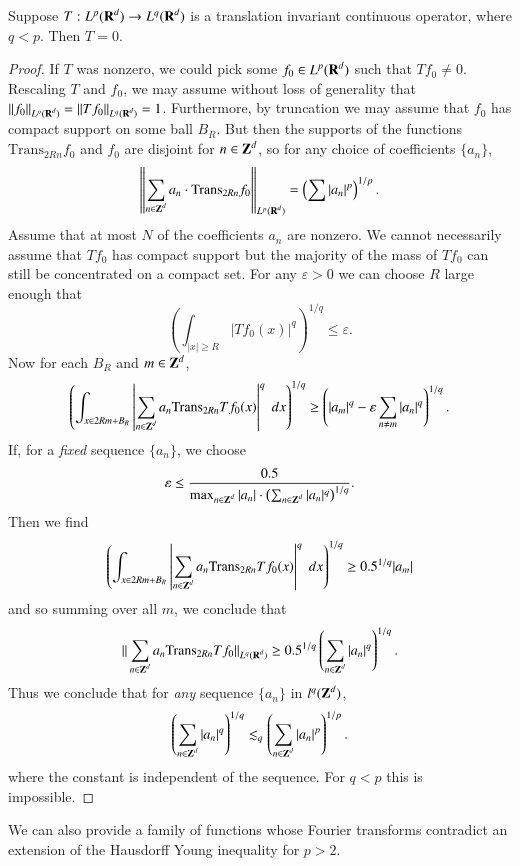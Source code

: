 \begin{theorem}
    Suppose $T: L^p(\operatorname{\mathbf{R}}^d) \to L^q(\operatorname{\mathbf{R}}^d)$ is a translation invariant continuous operator, where $q < p$. Then $T = 0$.
\end{theorem}
\begin{proof}
    If $T$ was nonzero, we could pick some $f_0 \in L^p(\operatorname{\mathbf{R}}^d)$ such that $Tf_0 \neq 0$. Rescaling $T$ and $f_0$, we may assume without loss of generality that $\| f_0 \|_{L^p(\operatorname{\mathbf{R}}^d)} = \| Tf_0 \|_{L^q(\operatorname{\mathbf{R}}^d)} = 1$. Furthermore, by truncation we may assume that $f_0$ has compact support on some ball $B_R$. But then the supports of the functions $\text{Trans}_{2Rn} f_0$ and $f_0$ are disjoint for $n \in \operatorname{\mathbf{Z}}^d$, so for any choice of coefficients $\{ a_n \}$,
    \[ \left\| \sum_{n \in \operatorname{\mathbf{Z}}^d} a_n \cdot \text{Trans}_{2R n} f_0 \right\|_{L^p(\operatorname{\mathbf{R}}^d)} = \left( \sum |a_n|^p \right)^{1/p}. \]
    Assume that at most $N$ of the coefficients $a_n$ are nonzero. We cannot necessarily assume that $Tf_0$ has compact support but the majority of the mass of $Tf_0$ can still be concentrated on a compact set. For any $\varepsilon > 0$ we can choose $R$ large enough that
    \[ \left( \int_{|x| \geq R} |Tf_0(x)|^q \right)^{1/q} \leq \varepsilon. \]
    Now for each $B_R$ and $m \in \operatorname{\mathbf{Z}}^d$,
    \[ \left( \int_{x \in 2Rm + B_R} \left| \sum_{n \in \operatorname{\mathbf{Z}}^d} a_n \text{Trans}_{2Rn} Tf_0(x) \right|^q\; dx \right)^{1/q} \geq \left( |a_m|^q - \varepsilon \sum_{n \neq m} |a_n|^q \right)^{1/q}. \]
    If, for a \emph{fixed} sequence $\{ a_n \}$, we choose
    \[ \varepsilon \leq \frac{0.5}{\max_{n \in \operatorname{\mathbf{Z}}^d}|a_n| \cdot \left( \sum_{n \in \operatorname{\mathbf{Z}}^d} |a_n|^q \right)^{1/q}}. \]
    Then we find
    \[ \left( \int_{x \in 2Rm + B_R} \left| \sum_{n \in \operatorname{\mathbf{Z}}^d} a_n \text{Trans}_{2Rn} Tf_0(x) \right|^q\; dx \right)^{1/q} \geq 0.5^{1/q} |a_m| \]
    and so summing over all $m$, we conclude that
    \[ \| \sum_{n \in \operatorname{\mathbf{Z}}^d} a_n \text{Trans}_{2Rn} Tf_0 \|_{L^q(\operatorname{\mathbf{R}}^d)} \geq 0.5^{1/q} \left( \sum_{n \in \operatorname{\mathbf{Z}}^d} |a_n|^q \right)^{1/q}. \]
    Thus we conclude that for \emph{any} sequence $\{ a_n \}$ in $l^q(\operatorname{\mathbf{Z}}^d)$,
    \[ \left( \sum_{n \in \operatorname{\mathbf{Z}}^d} |a_n|^q \right)^{1/q} \lesssim_q \left( \sum_{n \in \operatorname{\mathbf{Z}}^d} |a_n|^p \right)^{1/p}. \]
    where the constant is independent of the sequence. For $q < p$ this is impossible.
\end{proof}

We can also provide a family of functions whose Fourier transforms contradict an extension of the Hausdorff Young inequality for $p > 2$.

